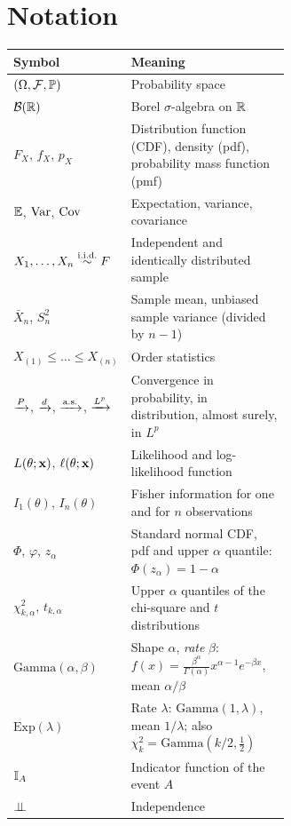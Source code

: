 \documentclass[main.tex]{subfiles}
\begin{document}
\section*{Notation}

\begin{center}
\begin{tabular}{@{}l>{\raggedright\arraybackslash}p{0.62\linewidth}@{}}
\toprule
\textbf{Symbol} & \textbf{Meaning} \\
\midrule
$(\Omega,\mathcal{F},\mathbb{P})$ & Probability space \\
$\mathcal{B}(\mathbb{R})$ & Borel $\sigma$-algebra on $\mathbb{R}$ \\
$F_X$, $f_X$, $p_X$ & Distribution function (CDF), density (pdf), probability mass function (pmf) \\
$\mathbb{E}$, $\operatorname{Var}$, $\operatorname{Cov}$ & Expectation, variance, covariance \\
$X_1,\dots,X_n \overset{\text{i.i.d.}}{\sim} F$ & Independent and identically distributed sample \\
$\bar X_n$, $S_n^2$ & Sample mean, unbiased sample variance (divided by $n-1$) \\
$X_{(1)}\le\dots\le X_{(n)}$ & Order statistics \\
$\xrightarrow{P}$, $\xrightarrow{d}$, $\xrightarrow{\text{a.s.}}$, $\xrightarrow{L^{p}}$ & Convergence in probability, in distribution, almost surely, in $L^p$ \\
$L(\theta;\mathbf{x})$, $\ell(\theta;\mathbf{x})$ & Likelihood and log-likelihood function \\
$I_1(\theta)$, $I_n(\theta)$ & Fisher information for one and for $n$ observations \\
$\Phi$, $\varphi$, $z_\alpha$ & Standard normal CDF, pdf and upper $\alpha$ quantile: $\Phi(z_\alpha)=1-\alpha$ \\
$\chi^2_{k,\alpha}$, $t_{k,\alpha}$ & Upper $\alpha$ quantiles of the chi-square and $t$ distributions \\
$\text{Gamma}(\alpha,\beta)$ & Shape $\alpha$, \emph{rate} $\beta$: $f(x)=\frac{\beta^\alpha}{\Gamma(\alpha)}x^{\alpha-1}e^{-\beta x}$, mean $\alpha/\beta$ \\
$\text{Exp}(\lambda)$ & Rate $\lambda$: $\text{Gamma}(1,\lambda)$, mean $1/\lambda$; also $\chi^2_k=\text{Gamma}(k/2,\frac12)$ \\
$\mathbb{I}_A$ & Indicator function of the event $A$ \\
$\perp\!\!\!\perp$ & Independence \\
\bottomrule
\end{tabular}
\end{center}
\end{document}
